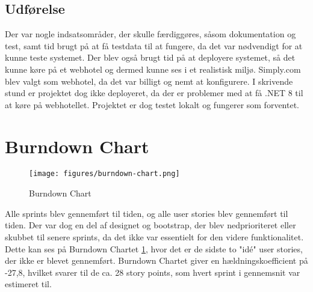 \subsection{Udførelse}
\label{subsec:sprint-6-udforelse}
Der var nogle indsatsområder, der skulle færdiggøres, såsom dokumentation og test, samt tid brugt på at få testdata til at fungere, da det var nødvendigt for at kunne teste systemet.
Der blev også brugt tid på at deployere systemet, så det kunne køre på et webhotel og dermed kunne ses i et realistisk miljø. 
Simply.com blev valgt som webhotel, da det var billigt og nemt at konfigurere. 
I skrivende stund er projektet dog ikke deployeret, da der er problemer med at få .NET 8 til at køre på webhotellet. Projektet er dog testet lokalt og fungerer som forventet.

\section{Burndown Chart}
\label{sec:burndown-chart}
\begin{figure}[H]
    \centering
    \texttt{[image: figures/burndown-chart.png]}
    \caption{Burndown Chart}
    \label{fig:burndown-chart}
\end{figure}

Alle sprints blev gennemført til tiden, og alle user stories blev gennemført til tiden. 
Der var dog en del af designet og bootstrap, der blev nedprioriteret eller skubbet til senere sprints, da det ikke var essentielt for den videre funktionalitet. 
Dette kan ses på Burndown Chartet \cref{fig:burndown-chart}, hvor det er de sidste to "idé" user stories, der ikke er blevet gennemført.
Burndown Chartet giver en hældningskoefficient på -27,8, hvilket svarer til de ca. 28 story points, som hvert sprint i gennemsnit var estimeret til.
